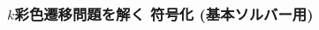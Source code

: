 \begin{frame}[shrink]
  \frametitle{$k$彩色遷移問題を解く 符号化 {\small(基本ソルバー用)}}

\begin{columns}[t]
\begin{column}{0.95\linewidth}
\begin{exampleblock}{}
 
\end{exampleblock}    
\end{column}
\end{columns}

\end{frame}
